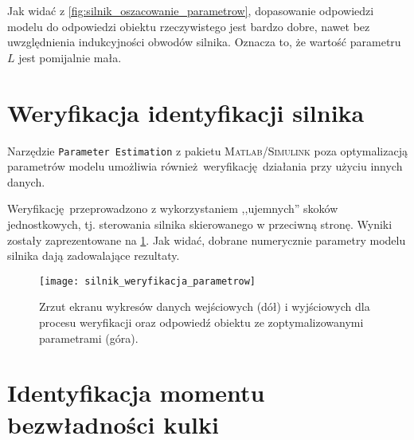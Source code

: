 Jak widać z \cref{fig:silnik_oszacowanie_parametrow}, dopasowanie odpowiedzi modelu do odpowiedzi obiektu rzeczywistego jest bardzo dobre, nawet bez uwzględnienia indukcyjności obwodów silnika. Oznacza to, że wartość parametru $L$ jest pomijalnie mała.

\section{Weryfikacja identyfikacji silnika}
\label{sec:ch5_weryfikacja_identyfikacji_silnika}

Narzędzie \texttt{Parameter Estimation} z pakietu \textsc{Matlab/Simulink} poza optymalizacją parametrów modelu umożliwia również weryfikację działania przy użyciu innych danych.

Weryfikację przeprowadzono z wykorzystaniem ,,ujemnych'' skoków jednostkowych, tj. sterowania silnika skierowanego w przeciwną stronę. Wyniki zostały zaprezentowane na \cref{fig:silnik_weryfikacja_parametrow}. Jak widać, dobrane numerycznie parametry modelu silnika dają zadowalające rezultaty.

\begin{figure}[h]
    \centering
    \texttt{[image: silnik\_weryfikacja\_parametrow]}
    \caption{Zrzut ekranu wykresów danych wejściowych (dół) i wyjściowych dla procesu weryfikacji oraz odpowiedź obiektu ze zoptymalizowanymi parametrami (góra).}
    \label{fig:silnik_weryfikacja_parametrow}
\end{figure}

\section{Identyfikacja momentu bezwładności kulki}
\label{sec:ch5_identyfikacja_bezwladnosci_kulki}


